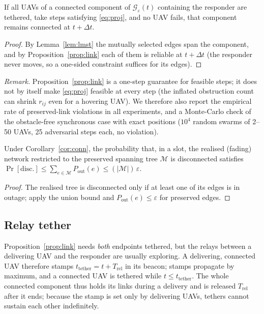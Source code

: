 \begin{corollary}\label{cor:conn}
If all UAVs of a connected component of $\mathcal{G}_\varepsilon(t)$ containing the responder
are tethered, take steps satisfying \eqref{eq:proj}, and no UAV fails, that component remains
connected at $t+\Delta t$.
\end{corollary}
\begin{proof}
By Lemma~\ref{lem:lmst} the mutually selected edges span the component, and by
Proposition~\ref{prop:link} each of them is reliable at $t+\Delta t$ (the responder never moves,
so a one-sided constraint suffices for its edges).
\end{proof}
\noindent\emph{Remark.} Proposition~\ref{prop:link} is a one-step guarantee for feasible steps;
it does not by itself make \eqref{eq:proj} feasible at every step (the inflated obstruction count
can shrink $r_{ij}$ even for a hovering UAV). We therefore also report the empirical rate of
preserved-link violations in all experiments, and a Monte-Carlo check of the obstacle-free
synchronous case with exact positions ($10^4$ random swarms of 2--50 UAVs, 25 adversarial steps each, no violation).

\begin{proposition}\label{prop:prob}
Under Corollary~\ref{cor:conn}, the probability that, in a slot, the realised (fading) network
restricted to the preserved spanning tree $\mathcal{M}$ is disconnected satisfies
$\Pr[\text{disc.}]\le\sum_{e\in\mathcal{M}}P_{\mathrm{out}}(e)\le(|\mathcal{M}|)\,\varepsilon$.
\end{proposition}
\begin{proof}
The realised tree is disconnected only if at least one of its edges is in outage; apply the union
bound and $P_{\mathrm{out}}(e)\le\varepsilon$ for preserved edges.
\end{proof}

\subsection{Relay tether}\label{sec:tether}
Proposition~\ref{prop:link} needs \emph{both} endpoints tethered, but the relays between a
delivering UAV and the responder are usually exploring. A delivering, connected UAV therefore
stamps $t_{\mathrm{tether}}=t+T_{\mathrm{rel}}$ in its beacon; stamps propagate by maximum, and a
connected UAV is tethered while $t\le t_{\mathrm{tether}}$. The whole connected component thus
holds its links during a delivery and is released $T_{\mathrm{rel}}$ after it ends; because the
stamp is set only by delivering UAVs, tethers cannot sustain each other indefinitely.

